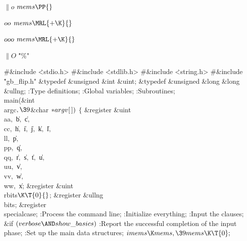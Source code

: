 \Y\B\4\D$\|o$ \5
$\\{mems}\PP{}$\par
\B\4\D$\\{oo}$ \5
$\\{mems}\MRL{+{\K}}{}$\par
\B\4\D$\\{ooo}$ \5
$\\{mems}\MRL{+{\K}}{}$\par
\B\4\D$\|O$ \5
\.{"\%"}\par
\Y\B\8\#\&{include} \.{<stdio.h>}\6
\8\#\&{include} \.{<stdlib.h>}\6
\8\#\&{include} \.{<string.h>}\6
\8\#\&{include} \.{"gb\_flip.h"}\6
\&{typedef} \&{unsigned} \&{int} \&{uint};\6
\&{typedef} \&{unsigned} \&{long} \&{long} \&{ullng};\7
:Type definitions\X;\6
:Global variables\X;\6
:Subroutines\X;\7
\\{main}(\&{int} \\{argc}${},\39{}$\&{char} ${}{*}\\{argv}[\,]){}$\1\1\2\2\6
${}\{{}$\1\6
\&{register} \&{uint} \\{aa}${},{}$ \|b${},{}$ \|c${},{}$ \\{cc}${},{}$ %
\|h${},{}$ \|i${},{}$ \|j${},{}$ \|k${},{}$ \|l${},{}$ \\{ll}${},{}$ \|p${},{}$
\\{pp}${},{}$ \|q${},{}$ \\{qq}${},{}$ \|r${},{}$ \|s${},{}$ \|t${},{}$ %
\|u${},{}$ \\{uu}${},{}$ \|v${},{}$ \\{vv}${},{}$ \|w${},{}$ \\{ww}${},{}$ \|x;%
\6
\&{register} \&{uint} \\{rbits}${}\K\T{0}{}$;\6
\&{register} \&{ullng} \\{bits};\6
\&{register} \\{specialcase};\7
:Process the command line\X;\6
:Initialize everything\X;\6
:Input the clauses\X;\6
\&{if} ${}(\\{verbose}\AND\\{show\_basics}){}$\1\5
:Report the successful completion of the input phase\X;\2\6
:Set up the main data structures\X;\6
${}\\{imems}\K\\{mems},\39\\{mems}\K\T{0};{}$\6
